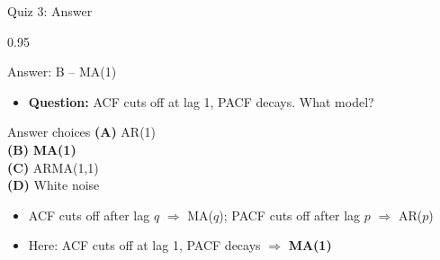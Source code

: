 \documentclass[9pt, aspectratio=169, t]{beamer}
\begin{document}
\begin{frame}{Quiz 3: Answer}
    \begin{cminipage}{0.95\textwidth}
    \begin{exampleblock}{Answer: B -- MA(1)}
        \begin{itemize}\setlength{\itemsep}{0pt}
            \item \textbf{Question:} ACF cuts off at lag 1, PACF decays. What model?
        \end{itemize}

        \vspace{0.3cm}

    \begin{block}{Answer choices}
        \textcolor{MainBlue}{\textbf{(A)}} AR(1) \incorrect\\[3pt]
        \textcolor{MainBlue}{\textbf{(B)}} \textbf{\textcolor{Forest}{MA(1)}} \correct\\[3pt]
        \textcolor{MainBlue}{\textbf{(C)}} ARMA(1,1) \incorrect\\[3pt]
        \textcolor{MainBlue}{\textbf{(D)}} White noise \incorrect
    \end{block}

        \vspace{0.3cm}

        \begin{itemize}
            \item ACF cuts off after lag $q$ $\Rightarrow$ MA($q$); PACF cuts off after lag $p$ $\Rightarrow$ AR($p$)
            \item Here: ACF cuts off at lag 1, PACF decays $\Rightarrow$ \textbf{MA(1)}
        \end{itemize}
    \end{exampleblock}

    \end{cminipage}
\end{frame}
\end{document}

